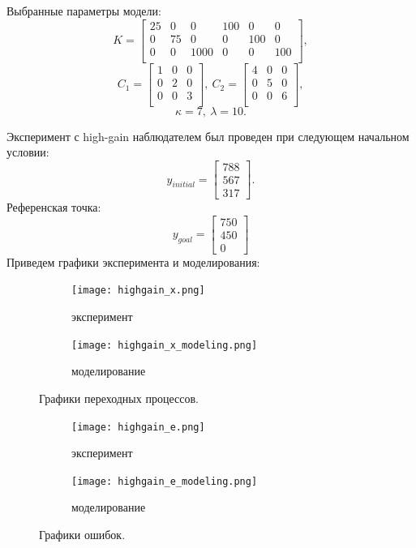 \documentclass[12pt]{article}
\begin{document}
Выбранные параметры модели:
\[
K = \begin{bmatrix}
    25 & 0 & 0 & 100 & 0 & 0 \\
    0 & 75 & 0 & 0 & 100 & 0 \\
    0 & 0 & 1000 & 0 & 0 & 100 \\
\end{bmatrix},
\]
\[
C_1 = \begin{bmatrix}
    1 & 0 & 0 \\
    0 & 2 & 0 \\
    0 & 0 & 3 \\
\end{bmatrix}, \ 
C_2 = \begin{bmatrix}
    4 & 0 & 0 \\
    0 & 5 & 0 \\
    0 & 0 & 6 \\
\end{bmatrix},
\]
\[
\kappa = 7, \ \lambda = 10.
\]

Эксперимент с high-gain наблюдателем был проведен при следующем начальном условии:
\[
y_{initial} = \begin{bmatrix}
    788 \\ 567 \\ 317
\end{bmatrix}.
\]
Референская точка:
\[
y_{goal} = \begin{bmatrix}
    750 \\ 450 \\ 0
\end{bmatrix}
\]
Приведем графики эксперимента и моделирования:
\begin{figure}[H]
    \centering
    \begin{subfigure}{0.49\textwidth}
        \centering
        \texttt{[image: highgain\_x.png]}
        \caption{эксперимент}
         \label{fig:highgain_x.png}
     \end{subfigure}
     \hfill
     \begin{subfigure}{0.49\textwidth}
         \centering
         \texttt{[image: highgain\_x\_modeling.png]}
         \caption{моделирование}
         \label{fig:highgain_x_modeling.png}
     \end{subfigure}
    \caption{Графики переходных процессов.}
    \label{fig:two graphs}
\end{figure}

\begin{figure}[H]
    \centering
    \begin{subfigure}{0.49\textwidth}
        \centering
        \texttt{[image: highgain\_e.png]}
        \caption{эксперимент}
         \label{fig:highgain_e.png}
     \end{subfigure}
     \hfill
     \begin{subfigure}{0.49\textwidth}
         \centering
         \texttt{[image: highgain\_e\_modeling.png]}
         \caption{моделирование}
         \label{fig:highgain_e_modeling.png}
     \end{subfigure}
    \caption{Графики ошибок.}
    \label{fig:two graphs}
\end{figure}
\end{document}
